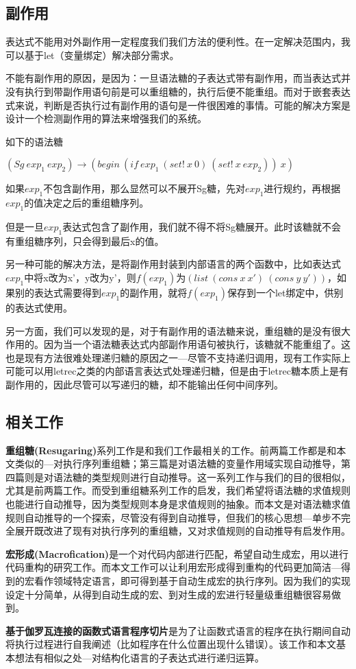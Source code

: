 \label{mark:side}\subsection{副作用}

表达式不能用对外副作用一定程度我们我们方法的便利性。在一定解决范围内，我可以基于let（变量绑定）解决部分需求。

不能有副作用的原因，是因为：一旦语法糖的子表达式带有副作用，而当表达式并没有执行到带副作用语句前是可以重组糖的，执行后便不能重组。而对于嵌套表达式来说，判断是否执行过有副作用的语句是一件很困难的事情。可能的解决方案是设计一个检测副作用的算法来增强我们的系统。

如下的语法糖

$(Sg~exp_{1}~exp_{2}) → (begin~(if~exp_{1}~(set!~x~0)~(set!~x~exp_{2}))~x)$

如果$exp_{1}$不包含副作用，那么显然可以不展开Sg糖，先对$exp_{1}$进行规约，再根据$exp_{1}$的值决定之后的重组糖序列。

但是一旦$exp_{1}$表达式包含了副作用，我们就不得不将Sg糖展开。此时该糖就不会有重组糖序列，只会得到最后x的值。

另一种可能的解决方法，是将副作用封装到内部语言的两个函数中，比如表达式$exp_{1}$中将x改为x'，y改为y'，则$f(exp_{1})$为$(list~(cons~x~x')~(cons~y~y'))$，如果别的表达式需要得到$exp_{1}$的副作用，就将$f(exp_{1})$保存到一个let绑定中，供别的表达式使用。

另一方面，我们可以发现的是，对于有副作用的语法糖来说，重组糖的是没有很大作用的。因为当一个语法糖表达式内部副作用语句被执行，该糖就不能重组了。这也是现有方法很难处理递归糖的原因之一---尽管不支持递归调用，现有工作实际上可能可以用letrec之类的内部语言表达式处理递归糖，但是由于letrec糖本质上是有副作用的，因此尽管可以写递归的糖，却不能输出任何中间序列。



\label{mark:relative}\subsection{相关工作}

{\bfseries 重组糖(Resugaring)}系列工作\cite{resugaring}\cite{hygienic}\cite{resugaringscpoe}\cite{resugaringtype}是和我们工作最相关的工作。前两篇工作都是和本文类似的---对执行序列重组糖；第三篇是对语法糖的变量作用域实现自动推导，第四篇则是对语法糖的类型规则进行自动推导。这一系列工作与我们的目的很相似，尤其是前两篇工作。而受到重组糖系列工作的启发，我们希望将语法糖的求值规则也能进行自动推导，因为类型规则本身是求值规则的抽象。而本文是对语法糖求值规则自动推导的一个探索，尽管没有得到自动推导，但我们的核心思想---单步不完全展开既改进了现有对执行序列的重组糖，又对求值规则的自动推导有启发作用。

{\bfseries 宏形成(Macrofication)}\cite{Macrofication}是一个对代码内部进行匹配，希望自动生成宏，用以进行代码重构的研究工作。而本文工作可以让利用宏形成得到重构的代码更加简洁---得到的宏看作领域特定语言，即可得到基于自动生成宏的执行序列。因为我们的实现设定十分简单，从得到自动生成的宏、到对生成的宏进行轻量级重组糖很容易做到。

{\bfseries 基于伽罗瓦连接的函数式语言程序切片}\cite{slicing}是为了让函数式语言的程序在执行期间自动将执行过程进行自我阐述（比如程序在什么位置出现什么错误）。该工作和本文基本想法有相似之处---对结构化语言的子表达式进行递归运算。
